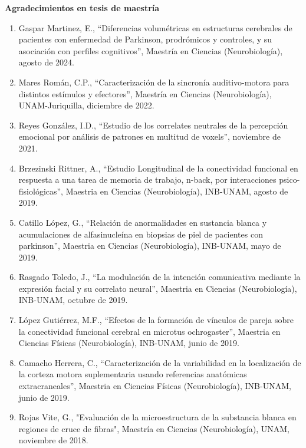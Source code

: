 \textbf{Agradecimientos en tesis de maestría}

\begin{enumerate}
\item Gaspar Martinez, E., “Diferencias volumétricas en estructuras cerebrales de pacientes con enfermedad de Parkinson, 
prodrómicos y controles, y su asociación con perfiles cognitivos”, Maestría en Ciencias (Neurobiología), agosto de 2024.

\item Mares Román, C.P., “Caracterización de la sincronía auditivo-motora para distintos estímulos y efectores”, Maestría en 
Ciencias (Neurobiología), UNAM-Juriquilla, diciembre de 2022.

\item Reyes González, I.D., “Estudio de los correlates neutrales de la percepción emocional por análisis
de patrones en multitud de voxels”, noviembre de 2021.

\item Brzezinski Rittner, A., “Estudio Longitudinal de la conectividad funcional en respuesta a una tarea de memoria de 
trabajo, 
n-back, por interacciones psico-fisiológicas”, Maestria en Ciencias (Neurobiología), INB-UNAM, 
agosto de 2019.

\item Catillo López, G., “Relación de anormalidades en sustancia blanca y acumulaciones de alfasinucleína en biopsias de piel 
de 
pacientes con parkinson”, Maestria en Ciencias (Neurobiología), INB-UNAM, mayo de 2019.

\item Rasgado Toledo, J., “La modulación de la intención comunicativa mediante la expresión facial y su correlato neural”, 
Maestria en Ciencias (Neurobiología), INB-UNAM, octubre de 2019.

\item López Gutiérrez, M.F., “Efectos de la formación de vínculos de pareja sobre la conectividad funcional cerebral en 
microtus 
ochrogaster”, Maestria en Ciencias Físicas (Neurobiología), INB-UNAM, junio de 2019.

\item Camacho Herrera, C., “Caracterización de la variabilidad en la localización de la corteza motora suplementaria usando 
referencias anatómicas extracraneales”, Maestria en Ciencias Físicas (Neurobiología), INB-UNAM, 
junio de 2019.

\item Rojas Vite, G., "Evaluación de la microestructura de la substancia blanca en regiones de cruce de fibras", Maestría en 
Ciencias (Neurobiología), UNAM, noviembre de 2018.


\end{enumerate}
